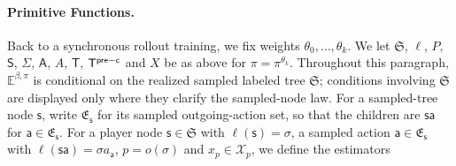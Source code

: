 \documentclass[12pt, a4paper]{article}
\begin{document}
\paragraph{Primitive Functions.}
Back to a synchronous rollout training, we fix weights $\theta_0,\ldots, \theta_k$.
We let $\mathfrak{S}$, $\ell$, $P$, $\mathsf{S}$, $\Sigma$, $\mathsf{A}$, $A$, $\mathsf{T}$, $\mathsf{T}^{\mathsf{pre-c}}$ and $X$ be as above for $\pi = \pi^{\theta_k}$.
Throughout this paragraph, $\mathbb E^{\beta,\pi}$ is conditional on the realized sampled labeled tree $\mathfrak S$; conditions involving $\mathfrak S$ are displayed only where they clarify the sampled-node law.
For a sampled-tree node $\mathsf{s}$, write $\mathfrak{E}_{\mathsf{s}}$ for its sampled outgoing-action set, so that the children are $\mathsf{s}\mathsf{a}$ for $\mathsf{a}\in\mathfrak{E}_{\mathsf{s}}$.
For a player node $\mathsf{s}\in \mathfrak{S}$ with $\ell(\mathsf{s})=\sigma$, a sampled action $\mathsf{a}\in\mathfrak{E}_{\mathsf{s}}$ with $\ell(\mathsf{s}\mathsf{a})=\sigma a_{\mathsf{a}}$, $p=o(\sigma)$ and $x_p\in\mathcal X_p$, we define the estimators
\end{document}
